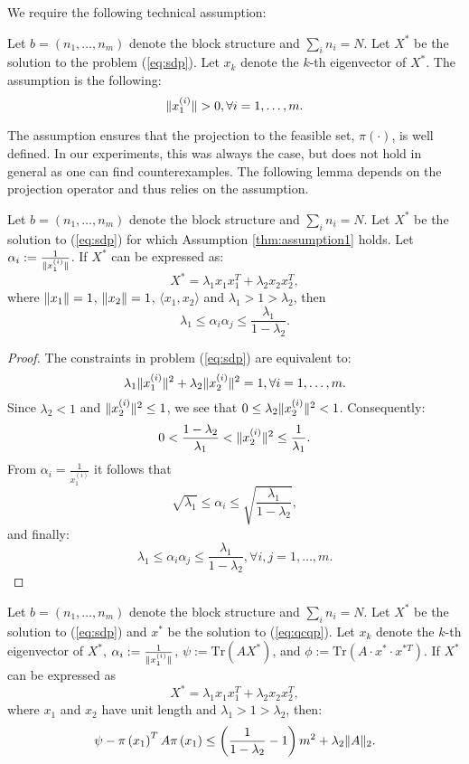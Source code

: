We require the following technical assumption:
\begin{assumption}\label{thm:assumption1}
Let $b = \left(n_1,\ldots,n_m\right)$ denote the block structure and $ \sum_i n_i = N $.
Let $X^*$ be the solution to the problem (\ref{eq:sdp}). Let $x_k$ denote the $k$-th
eigenvector of $X^*$. The assumption is the following:
$$\lVert x_1^{(i)}\rVert > 0, \forall i = 1,\ldots, m.$$
\end{assumption}

The assumption ensures that the projection to the feasible set,
$\pi(\cdot)$, is well defined. In our experiments, this was always
the case, but does not hold in general as one can find counterexamples.
The following lemma depends on the projection
operator and thus relies on the assumption.

\begin{lemma}
Let $b = \left(n_1,\ldots,n_m\right)$ denote the block structure and $ \sum_i n_i = N $.
Let $X^*$ be the solution to (\ref{eq:sdp}) for which Assumption \ref{thm:assumption1} holds.
Let $\alpha_i := \frac{1}{\lVert x_1^{(i)}\rVert}$.
If $X^*$ can be expressed as:
$$X^* = \lambda_1  x_1 x_1^T + \lambda_2 x_2 x_2^T,$$
where $\lVert x_1\rVert=1$, $\lVert x_2\rVert=1$, $\langle x_1, x_2 \rangle$ and $\lambda_1 > 1 >  \lambda_2$, then
$$\lambda_1 \leq \alpha_i \alpha_j  \leq \frac{\lambda_1}{1 - \lambda_2}.$$
\end{lemma}

\begin{proof}
The constraints in problem (\ref{eq:sdp}) are equivalent to:
$$\lambda_1 \lVert x_1^{(i)}\rVert^2 + \lambda_2 \lVert x_2^{(i)}\rVert^2 = 1, \forall i = 1,\ldots, m.$$
Since $\lambda_2 < 1$ and $\lVert x_2^{(i)}\rVert^2 \leq 1$,
we see that $0 \leq \lambda_2 \lVert x_2^{(i)}\rVert^2  < 1$.
Consequently:
$$  0 < \frac{1- \lambda_2}{\lambda_1} < \lVert x_2^{(i)}\rVert^2 \leq \frac{1}{\lambda_1}.$$
From $\alpha_i = \frac{1}{x_1^{(i)}}$ it follows that
$$ \sqrt{\lambda_1} \leq \alpha_i \leq \sqrt{\frac{\lambda_1}{1-\lambda_2}},$$
and finally:
$$ \lambda_1 \leq \alpha_i \alpha_j \leq \frac{\lambda_1}{1-\lambda_2}, \forall i,j = 1,\ldots,m.$$
\end{proof}

\begin{proposition}\label{thm:rank2sdp_solution}
Let $b = \left(n_1,\ldots,n_m\right)$ denote the block structure and $ \sum_i n_i = N $.
Let $X^*$ be the solution to (\ref{eq:sdp}) and $x^{*}$ be the solution to  (\ref{eq:qcqp}).
Let $x_k$ denote the $k$-th eigenvector of $X^*$, $\alpha_i := \frac{1}{\lVert x_1^{(i)}\rVert}$,
$\psi := \mathrm{Tr}\left(A X^{*}\right)$, and $\phi := \mathrm{Tr}\left(A \cdot x^{*} \cdot x^{*T}\right)$.
If $X^*$ can be expressed as
$$X^* = \lambda_1  x_1 x_1^T + \lambda_2 x_2 x_2^T,$$
where $x_1$ and $x_2$ have unit length and $\lambda_1 > 1 >  \lambda_2$,
 then: $$\psi - \pi\left(x_1\right)^T A \pi\left(x_1\right) \leq \left(\frac{1}{1-\lambda_2} -1\right)  m^2 + \lambda_2 \lVert A\rVert_2.$$
\end{proposition}

